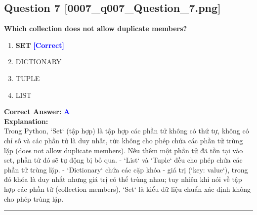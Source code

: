 \documentclass[11pt,a4paper]{article}
\begin{document}
\begin{minipage}{\textwidth}
\subsection*{Question 7 \quad \footnotesize{[0007_q007_Question_7.png]}}
\noindent \textbf{Which collection does not allow duplicate members?}

\begin{enumerate}[label=\Alph*.]
    \item \textbf{SET} \hfill \textcolor{blue}{\textbf{[Correct]}}
    \item DICTIONARY
    \item TUPLE
    \item LIST
\end{enumerate}

\noindent \textbf{Correct Answer:} \textcolor{blue}{\textbf{A}} \\[4pt]
\noindent \textbf{Explanation:}\\
Trong Python, `Set` (tập hợp) là tập hợp các phần tử không có thứ tự, không có chỉ số và các phần tử là duy nhất, tức không cho phép chứa các phần tử trùng lặp (does not allow duplicate members). Nếu thêm một phần tử đã tồn tại vào set, phần tử đó sẽ tự động bị bỏ qua.\newline
- `List` và `Tuple` đều cho phép chứa các phần tử trùng lặp.\newline
- `Dictionary` chứa các cặp khóa - giá trị (`key: value`), trong đó khóa là duy nhất nhưng giá trị có thể trùng nhau; tuy nhiên khi nói về tập hợp các phần tử (collection members), `Set` là kiểu dữ liệu chuẩn xác định không cho phép trùng lặp.
\end{minipage}
\vspace{0.8cm}
\hrule
\vspace{0.5cm}
\end{document}
